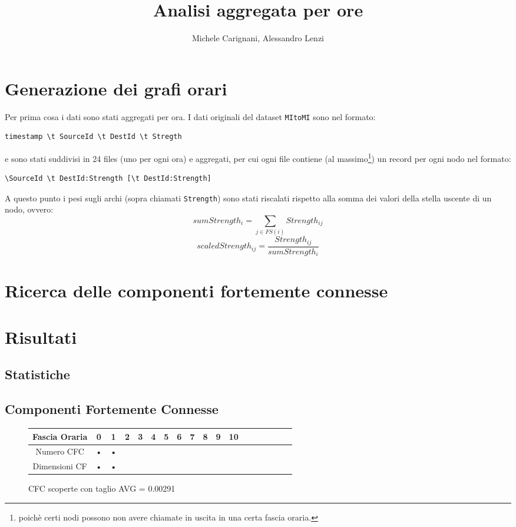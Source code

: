 \documentclass[10pt,a4paper]{article}
\author{Michele Carignani, Alessandro Lenzi}
\title{Analisi aggregata per ore}
\begin{document}
\maketitle

\section{Generazione dei grafi orari}

Per prima cosa i dati sono stati aggregati per ora. I dati originali del dataset \verb!MItoMI! sono nel formato:
\begin{verbatim}
timestamp \t SourceId \t DestId \t Stregth
\end{verbatim}
e sono stati suddivisi in 24 files (uno per ogni ora) e aggregati, per cui
ogni file contiene (al massimo\footnote{poichè certi nodi possono non avere chiamate in uscita
in una certa fascia oraria.}) un record per ogni nodo nel formato:
\begin{verbatim}
\SourceId \t DestId:Strength [\t DestId:Strength]
\end{verbatim}

A questo punto i pesi sugli archi (sopra chiamati \verb!Strength!) sono stati riscalati rispetto alla somma
dei valori della stella uscente di un nodo, ovvero:
$$ sumStrength_i = \sum_{j \in FS(i)} Strength_{ij} $$
$$ scaledStrength_{ij} = \frac{Strength_{ij}}{sumStrength_i} $$

\section{Ricerca delle componenti fortemente connesse}

\section{Risultati}

\subsection{Statistiche}

\subsection{Componenti Fortemente Connesse}

\begin{figure}[h]
\begin{center}
\begin{tabular}{|c|c|c|c|c|c|c|c|c|c|c|c|c|c|c|c|c|c|}
\hline 
Fascia Oraria & 0 & 1 & 2 & 3 & 4 & 5 & 6 & 7 & 8 & 9 & 10 &  \\ 
\hline 
Numero CFC & • & • \\ 
\hline 
Dimensioni CF & • & • \\ 
\hline 
\end{tabular} 
\caption{CFC scoperte con taglio AVG = 0.00291}
\end{center}
\end{figure}
\end{document}

